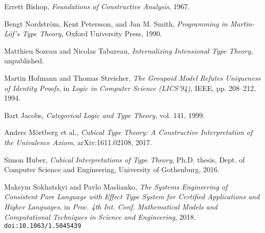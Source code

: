 \documentclass{article}
\theoremstyle{definition}
\begin{document}
\begin{thebibliography}{99}
Errett Bishop,
\textit{Foundations of Constructive Analysis},
1967.

Bengt Nordström, Kent Petersson, and Jan M. Smith,
\textit{Programming in Martin-Löf’s Type Theory},
Oxford University Press, 1990.

Matthieu Sozeau and Nicolas Tabareau,
\textit{Internalizing Intensional Type Theory},
unpublished.

Martin Hofmann and Thomas Streicher,
\textit{The Groupoid Model Refutes Uniqueness of Identity Proofs},
in \textit{Logic in Computer Science (LICS'94)}, IEEE, pp. 208–212, 1994.

Bart Jacobs,
\textit{Categorical Logic and Type Theory},
vol. 141, 1999.

Anders Mörtberg et al.,
\textit{Cubical Type Theory: A Constructive Interpretation of the Univalence Axiom},
arXiv:1611.02108, 2017.

Simon Huber,
\textit{Cubical Interpretations of Type Theory},
Ph.D. thesis, Dept. of Computer Science and Engineering, University of Gothenburg, 2016.

Maksym Sokhatskyi and Pavlo Maslianko,
\textit{The Systems Engineering of Consistent Pure Language with Effect Type System for Certified Applications and Higher Languages},
in \textit{Proc. 4th Int. Conf. Mathematical Models and Computational Techniques in Science and Engineering},
2018.
\texttt{doi:10.1063/1.5045439}
\end{thebibliography}
\end{document}
